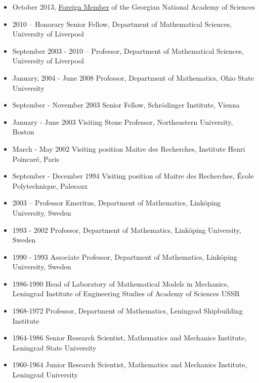 \documentclass{article}
\begin{document}
\begin{itemize}

\item October 2013, 
  \href{http://www.science.org.ge/Documents/Diploma/Mazya.pdf}
  {Foreign Member}
  of the Georgian National Academy of Sciences
\item 2010 --\hskip 2mm Honorary Senior  Fellow, Department of Mathematical Sciences, University of Liverpool
\item September 2003 - 2010 --\hskip 2mm Professor, Department of Mathematical Sciences, University of Liverpool
\item January, 2004 - June 2008 \hskip 2mm Professor,  Department of Mathematics, Ohio State University
\item September - November 2003 Senior Fellow, Schr\"odinger Institute, Vienna
\item January - June 2003 Visiting Stone Professor, Northeastern University, Boston  
\item March - May 2002 Visiting position  Maitre des
Recherches, Institute Henri Poincar\'e, Paris
      \item September - December 1994 Visiting position of Maitre des
Recherches, {\'E}cole  Polytechnique, Palesaux
      \item 2003  -- \hskip2mm Professor Emeritus, Department of Mathematics,  Link\"oping University, Sweden
\item 1993 - 2002 Professor,
 Department of Mathematics,  Link\"oping 
  University, Sweden
       \item 1990 - 1993 Associate Professor, Department of
Mathematics, 
  Link\"oping University, Sweden
       \item 1986-1990 Head of Laboratory of
Mathematical Models in 
  Mechanics, Leningrad Institute of Engineering Studies of Academy of 
  Sciences USSR
       \item 1968-1972 Professor,  Department of Mathematics,
Leningrad Shipbuilding Institute
       \item 1964-1986 Senior Research
Scientist, Mathematics and Mechanics 
  Institute, Leningrad State University
       \item 1960-1964 Junior Research
Scientist, Mathematics and Mechanics 
  Institute, Leningrad University
\end{itemize}

\medskip
\end{document}

